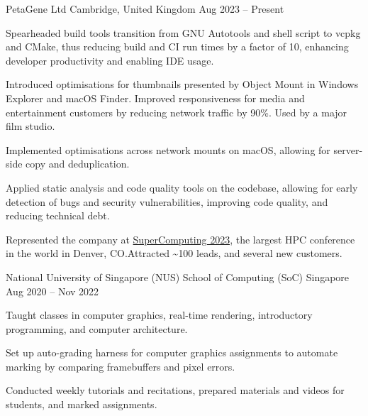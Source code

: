 \begin{cventries}
	{PetaGene Ltd} %
	{Cambridge, United Kingdom} %
	{Aug 2023 -- Present} %
	{
		\begin{cvitems} %
			\item Spearheaded build tools transition from GNU Autotools and shell script to vcpkg and CMake, thus reducing build and CI run times by a factor of 10, enhancing developer productivity and enabling IDE usage.
			\item Introduced optimisations for thumbnails presented by Object Mount in Windows Explorer and macOS Finder. Improved responsiveness for media and entertainment customers by reducing network traffic by 90\%. Used by a major film studio.
			\item Implemented optimisations across network mounts on macOS, allowing for server-side copy and deduplication.
			\item Applied static analysis and code quality tools on the codebase, allowing for early detection of bugs and security vulnerabilities, improving code quality, and reducing technical debt.
			\item Represented the company at \href{https://hallerickson.ungerboeck.com/prod/app85.cshtml?aat=5663535078317a434974474478437845326c2b766b2b4c562b355033396d433556704e2b3065744c5161773d&ExhibitorID=7040}{SuperComputing 2023}, the largest HPC conference in the world in Denver, CO.\@ Attracted \textasciitilde100 leads, and several new customers.
		\end{cvitems}
	}


	{National University of Singapore (NUS) School of Computing (SoC)} %
	{Singapore} %
	{Aug 2020 -- Nov 2022} %
	{
		\begin{cvitems} %
			\item Taught classes in computer graphics, real-time rendering, introductory programming, and computer architecture.
			\item Set up auto-grading harness for computer graphics assignments to automate marking by comparing framebuffers and pixel errors.
			\item Conducted weekly tutorials and recitations, prepared materials and videos for students, and marked assignments.
		\end{cvitems}
	}


\end{cventries}
